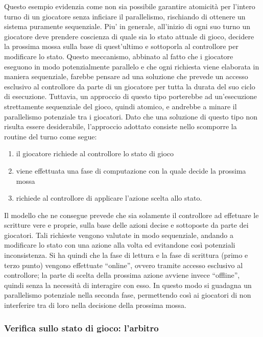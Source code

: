  Questo esempio evidenzia come non sia possibile garantire atomicità per l'intero turno di un giocatore senza inficiare il parallelismo, rischiando di ottenere un sistema puramente sequenziale. Piu' in generale, all'inizio di ogni suo turno un giocatore deve prendere coscienza di quale sia lo stato attuale di gioco, decidere la prossima mossa sulla base di quest'ultimo e sottoporla al controllore per modificare lo stato. Questo meccanismo, abbinato al fatto che i giocatore eseguono in modo potenzialmente parallelo e che ogni richiesta viene elaborata in maniera sequenziale, farebbe pensare ad una soluzione che prevede un accesso esclusivo al controllore da parte di un giocatore per tutta la durata del suo ciclo di esecuzione. Tuttavia, un approccio di questo tipo porterebbe ad un'esecuzione strettamente sequenziale del gioco, quindi atomico, e andrebbe a minare il parallelismo potenziale tra i giocatori. Dato che una soluzione di questo tipo non risulta essere desiderabile, l'approccio adottato consiste nello scomporre la routine del turno come segue:\\

\begin{enumerate}
	\item il giocatore richiede al controllore lo stato di gioco
	\item viene effettuata una fase di computazione con la quale decide la prossima mossa
	\item richiede al controllore di applicare l'azione scelta allo stato.
\end{enumerate}

Il modello che ne consegue prevede che sia solamente il controllore ad effetuare le scritture vere e proprie, sulla base delle azioni decise e sottoposte da parte dei giocatori. Tali richieste vengono valutate in modo sequenziale, andando a modificare lo stato con una azione alla volta ed evitandone così potenziali inconsistenza. Si ha quindi che la fase di lettura e la fase di scrittura (primo e terzo punto) vengono effettuate “online”, ovvero tramite accesso esclusivo al controllore; la parte di scelta della prossima azione avviene invece “offline”, quindi senza la necessità di interagire con esso. In questo modo si guadagna un parallelismo potenziale nella seconda fase, permettendo così ai giocatori di non interferire tra di loro nella decisione della prossima mossa.\\

\subsubsection{Verifica sullo stato di gioco: l'arbitro}
\label{sec:modello_verifica_arbitro}

